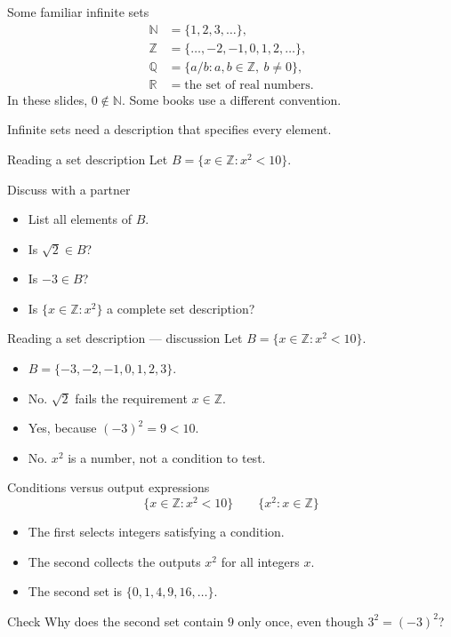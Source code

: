 \documentclass{beamer}
\newcommand{\N}{\mathbb{N}}
\newcommand{\Z}{\mathbb{Z}}
\newcommand{\R}{\mathbb{R}}
\begin{document}
\begin{frame}{Some familiar infinite sets}
\[\begin{aligned}\N&=\{1,2,3,\ldots\},\\\Z&=\{\ldots,-2,-1,0,1,2,\ldots\},\\\mathbb Q&=\{a/b:a,b\in\Z,\ b\ne0\},\\\R&=\text{the set of real numbers}.\end{aligned}\]\medskip In these slides, $0\notin\N$. Some books use a different convention.\medskip\par Infinite sets need a description that specifies every element.
\end{frame}
\begin{frame}{Reading a set description}
Let $B=\{x\in\Z:x^2<10\}$.
\begin{block}{Discuss with a partner}
\begin{itemize}
\item List all elements of $B$.
\item Is $\sqrt2\in B$?
\item Is $-3\in B$?
\item Is $\{x\in\Z:x^2\}$ a complete set description?
\end{itemize}
\end{block}
\end{frame}
\begin{frame}{Reading a set description --- discussion}
Let $B=\{x\in\Z:x^2<10\}$.
\begin{itemize}
\item $B=\{-3,-2,-1,0,1,2,3\}$.
\item No. $\sqrt2$ fails the requirement $x\in\Z$.
\item Yes, because $(-3)^2=9<10$.
\item No. $x^2$ is a number, not a condition to test.
\end{itemize}
\end{frame}
\begin{frame}{Conditions versus output expressions}
\[\{x\in\Z:x^2<10\}\qquad\{x^2:x\in\Z\}\]\begin{itemize}
\item The first selects integers satisfying a condition.
\item The second collects the outputs $x^2$ for all integers $x$.
\item The second set is $\{0,1,4,9,16,\ldots\}$.
\end{itemize}\begin{block}{Check}
Why does the second set contain $9$ only once, even though $3^2=(-3)^2$?
\end{block}
\end{frame}
\end{document}
